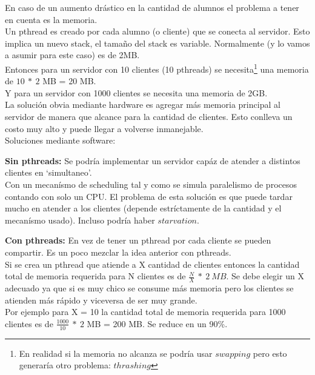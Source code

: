 En caso de un aumento drástico en la cantidad de alumnos el problema a tener en cuenta es la memoria.\\

Un pthread es creado por cada alumno (o cliente) que se conecta al servidor. Esto implica un nuevo stack, 
el tamaño del stack es variable. Normalmente (y lo vamos a asumir para este caso) es de 2MB.\\ 

Entonces para un servidor con 10 clientes (10 pthreads) se necesita\footnote{En realidad si la memoria no alcanza se podría usar $swapping$ pero esto generaría otro problema: $thrashing$} %
una memoria de $10\ *\ 2$ MB = 20 MB.\\
Y para un servidor con 1000 clientes se necesita una memoria de 2GB.\\

La solución obvia mediante hardware es agregar más memoria principal al servidor de manera que alcance para la cantidad de clientes.
Esto conlleva un costo muy alto y puede llegar a volverse inmanejable.\\

Soluciones mediante software:
\begin{description}
 \item \textbf{Sin pthreads:} Se podría implementar un servidor capáz de atender a distintos clientes en \textquoteleft simultaneo\textquoteright.\\
 Con un mecanísmo de scheduling tal y como se simula paralelismo de procesos contando con solo un CPU.  
 El problema de esta solución es que puede tardar mucho en atender a los clientes (depende estríctamente de la cantidad y el mecanísmo usado).
 Incluso podría haber $starvation$.
 
 \item \textbf{Con pthreads:} En vez de tener un pthread por cada cliente se pueden compartir. Es un poco mezclar la idea anterior con pthreads.\\
 Si se crea un pthread que atiende a X cantidad de clientes entonces la cantidad total de memoria requerida para N clientes es de $\frac{N}{X}\ *\ 2\ MB$.
 Se debe elegir un X adecuado ya que si es muy chico se consume más memoria pero los clientes se atienden más rápido y viceversa de ser muy grande.\\
 Por ejemplo para X = 10 la cantidad total de memoria requerida para 1000 clientes es de $\frac{1000}{10}\ *\ 2$ MB = 200 MB. Se reduce en un 90\%.
\end{description}